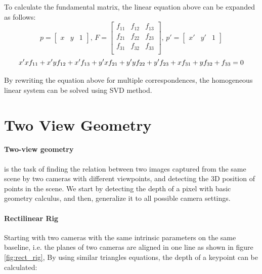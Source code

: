 \documentclass[11pt]{article}
\begin{document}
    To calculate the fundamental matrix, the linear equation above can be expanded as follows:
    \begin{equation*}
        p =
        \begin{bmatrix}
            x & y & 1
        \end{bmatrix}
        \text{, }
        F =
        \begin{bmatrix}
        f_{11} & f_{12} & f_{13} \\
        f_{21} & f_{22} & f_{23} \\
        f_{31} & f_{32} & f_{33} \\
        \end{bmatrix}
        \text{, }
        p' =
        \begin{bmatrix}
            x' & y' & 1
        \end{bmatrix}
    \end{equation*}
    \begin{equation*}
        x'xf_{11} + x'yf_{12} + x'f_{13} + y'xf_{21} + y'yf_{22} + y'f_{23} + xf_{31} + yf_{32} + f_{33} = 0 \\
    \end{equation*}

    By rewriting the equation above for multiple correspondences, the homogeneous linear system can be solved using SVD method.

    \section{Two View Geometry}

    \paragraph{Two-view geometry} is the task of finding the relation between two images captured from the same scene
    by two cameras with different viewpoints, and detecting the 3D position of points in the scene. We start by
    detecting the depth of a pixel with basic geometry calculus, and then, generalize it to all possible camera settings.

    \paragraph{Rectilinear Rig} Starting with two cameras with the same intrinsic parameters on the same baseline, i.e. the planes of
    two cameras are aligned in one line as shown in figure \ref{fig:rect_rig}, By using similar triangles equations,
    the depth of a keypoint can be calculated:
\end{document}

